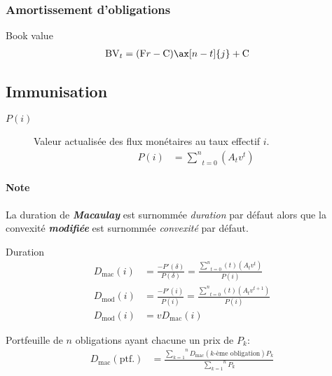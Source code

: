 \documentclass[10pt, french]{article}
\begin{document}
\begin{multicols*}{2}
\subsubsection*{Amortissement d'obligations}

Book value
\begin{align*}
	\text{BV}_{t}
		&=	(\text{F}r - \text{C}) \ax[n - t]{j} + \text{C}
\end{align*}

\columnbreak

\subsection*{Immunisation}

\begin{description}
	\item[$P(i)$]	Valeur actualisée des flux monétaires au taux effectif $i$.
		\begin{align*}
		P(i)	
		&=	\underset{t = 0}{\overset{n}{\sum}} (A_{t}v^{t})
		\end{align*}
\end{description}

\paragraph{Note}	La duration de \textit{\textbf{Macaulay}} est surnommée \og \textit{duration} \fg{} par défaut alors que la convexité \textit{\textbf{modifiée}} est surnommée \og \textit{convexité} \fg{} par défaut.

\begin{rappel}{Duration}
\begin{align*}
	D_{\text{mac}}(i)
	&=	\frac{-P'(\delta)}{P(\delta)}
	=	\frac{\underset{t = 0}{\overset{n}{\sum}} (t) (A_{t}v^{t})}{P(i)}	\\
	D_{\text{mod}}(i)
	&=	\frac{-P'(i)}{P(i)}	
	=	\frac{\underset{t = 0}{\overset{n}{\sum}} (t) (A_{t}v^{t + 1})}{P(i)}	\\
	D_{\text{mod}}(i)
	&=	vD_{\text{mac}}(i)
\end{align*}

\tcbline

Portfeuille de $n$ obligations ayant chacune un prix de $P_k$:
\begin{align*}
	D_{\text{mac}}(\text{ptf.}) 
	&=	\frac{\overset{n}{\underset{k = 1}{\sum}} D_{\text{mac}}(\text{$k$-ème obligation}) P_{k}}{\overset{n}{\underset{k = 1}{\sum}} P_{k}}
\end{align*}
\end{rappel}


\end{multicols*}
\end{document}
